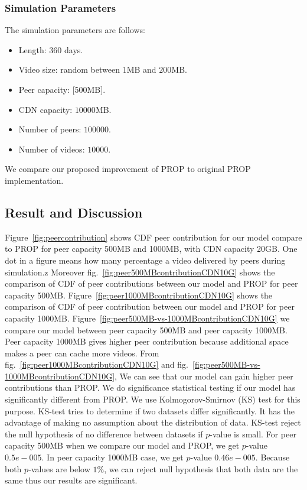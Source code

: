 \documentclass[10pt,final,journal,a4paper]{IEEEtran}
\begin{document}
\subsubsection{Simulation Parameters}
The simulation parameters are follows:
\begin{itemize}
\item Length: $360$ days.
\item Video size: random between $1$MB and $200$MB.
\item Peer capacity: [500MB].
\item CDN capacity: $10000$MB.
\item Number of peers: $100000$.
\item Number of videos: $10000$.
\end{itemize}
We compare our proposed improvement of PROP to original PROP \cite{1613869} implementation.



\subsection{Result and Discussion}\label{resultanddiscussion}

Figure~\ref{fig:peercontribution} shows CDF peer contribution for our model compare to PROP for peer capacity 500MB and 1000MB, with CDN capacity 20GB. 
One dot in a figure means how many percentage a video delivered by peers during simulation.z
Moreover fig.~\ref{fig:peer500MBcontributionCDN10G} shows the comparison of CDF of peer contributions between our model and PROP for peer capacity 500MB. 
Figure~\ref{fig:peer1000MBcontributionCDN10G} shows the comparison of CDF of peer contribution between our model and PROP for peer capacity 1000MB.
Figure~\ref{fig:peer500MB-vs-1000MBcontributionCDN10G} we compare our model between peer capacity 500MB and peer capacity 1000MB.
Peer capacity 1000MB gives higher peer contribution because additional space makes a peer can cache more videos.
From fig.~\ref{fig:peer1000MBcontributionCDN10G} and fig.~\ref{fig:peer500MB-vs-1000MBcontributionCDN10G}, We can see that our model can gain higher peer contributions than PROP.
We do significance statistical testing if our model has significantly different from PROP.
We use Kolmogorov-Smirnov (KS) test for this purpose.  
KS-test tries to determine if two datasets differ significantly.
It has the advantage of making no assumption about the distribution of data. 
KS-test reject the null hypothesis of no difference between datasets if $p$-value is small.
For peer capacity 500MB when we compare our model and PROP, we get $p$-value $0.5e-005$.
In peer capacity 1000MB case, we get $p$-value $0.46e-005$.
Because both $p$-values are below $1\%$, we can reject null hypothesis that both data are the same thus our results are significant.
\end{document}
